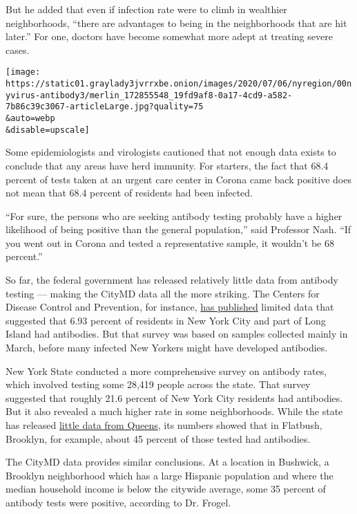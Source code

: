 But he added that even if infection rate were to climb in wealthier
neighborhoods, ``there are advantages to being in the neighborhoods that
are hit later.'' For one, doctors have become somewhat more adept at
treating severe cases.

\texttt{[image: https://static01.graylady3jvrrxbe.onion/images/2020/07/06/nyregion/00nyvirus-antibody3/merlin\_172855548\_19fd9af8-0a17-4cd9-a582-7b86c39c3067-articleLarge.jpg?quality=75\\\&auto=webp\\\&disable=upscale]}

Some epidemiologists and virologists cautioned that not enough data
exists to conclude that any areas have herd immunity. For starters, the
fact that 68.4 percent of tests taken at an urgent care center in Corona
came back positive does not mean that 68.4 percent of residents had been
infected.

``For sure, the persons who are seeking antibody testing probably have a
higher likelihood of being positive than the general population,'' said
Professor Nash. ``If you went out in Corona and tested a representative
sample, it wouldn't be 68 percent.''

So far, the federal government has released relatively little data from
antibody testing --- making the CityMD data all the more striking. The
Centers for Disease Control and Prevention, for instance,
\href{https://www.cdc.gov/coronavirus/2019-ncov/cases-updates/commercial-lab-surveys.html}{has
published} limited data that suggested that 6.93 percent of residents in
New York City and part of Long Island had antibodies. But that survey
was based on samples collected mainly in March, before many infected New
Yorkers might have developed antibodies.

New York State conducted a more comprehensive survey on antibody rates,
which involved testing some 28,419 people across the state. That survey
suggested that roughly 21.6 percent of New York City residents had
antibodies. But it also revealed a much higher rate in some
neighborhoods. While the state has released
\href{https://www.medrxiv.org/content/10.1101/2020.05.25.20113050v1.full.pdf}{little
data from Queens}, its numbers showed that in Flatbush, Brooklyn, for
example, about 45 percent of those tested had antibodies.

The CityMD data provides similar conclusions. At a location in Bushwick,
a Brooklyn neighborhood which has a large Hispanic population and where
the median household income is below the citywide average, some 35
percent of antibody tests were positive, according to Dr. Frogel.

